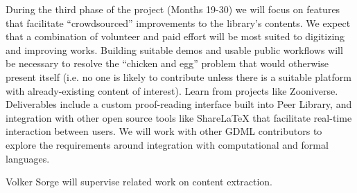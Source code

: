 \documentclass{article}
\begin{document}
During the third phase of the project (Months 19-30) we will focus on
features that facilitate ``crowdsourced'' improvements to the
library's contents.  We expect that a combination of volunteer and
paid effort will be most suited to digitizing and improving works.
Building suitable demos and usable public workflows will be necessary
to resolve the ``chicken and egg'' problem that would otherwise
present itself (i.e. no one is likely to contribute unless there is a
suitable platform with already-existing content of interest).  Learn from projects like Zooniverse.
%
Deliverables include a custom proof-reading interface built into Peer
Library, and integration with other open source tools like ShareLaTeX
that facilitate real-time interaction between users.  We will work with other GDML contributors to 
explore the requirements around integration with computational and formal languages.

Volker Sorge will supervise related work on content extraction.
\end{document}
